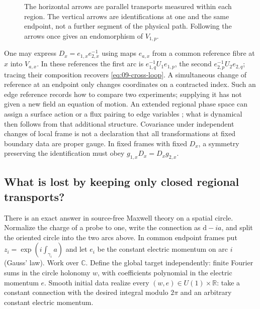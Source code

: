 \begin{figure}[htb]\centering
{}
\caption{The horizontal arrows are parallel transports measured within each region. The vertical arrows are identifications at one and the same endpoint, not a further segment of the physical path. Following the arrows once gives an endomorphism of $V_{1,p}$.}\label{fig:transport-cycle}\end{figure}

One may express $D_x=e_{1,x}e_{2,x}^{-1}$ using maps $e_{a,x}$ from a common reference fibre at $x$ into $V_{a,x}$. In these references the first arc is $e_{1,q}^{-1}U_1 e_{1,p}$, the second $e_{2,p}^{-1}U_2 e_{2,q}$; tracing their composition recovers \eqref{eq:09-cross-loop}. A simultaneous change of reference at an endpoint only changes coordinates on a contracted index. Such an edge reference records how to compare two experiments; supplying it has not given a new field an equation of motion. An extended regional phase space can assign a surface action or a flux pairing to edge variables \cite{DF}; what is dynamical then follows from that additional structure. Covariance under independent changes of local frame is not a declaration that all transformations at fixed boundary data are proper gauge. In fixed frames with fixed $D_x$, a symmetry preserving the identification must obey $g_{1,x}D_x=D_xg_{2,x}$.

\subsection{What is lost by keeping only closed regional transports?}

There is an exact answer in source-free Maxwell theory on a spatial circle. Normalize the charge of a probe to one, write the connection as $\mathrm{d}-i a$, and split the oriented circle into the two arcs above. In common endpoint frames put $z_i=\exp(i\int_{\gamma_i}a)$ and let $e_i$ be the constant electric momentum on arc $i$ (Gauss' law). Work over $\mathbb C$. Define the global target independently: finite Fourier sums in the circle holonomy $w$, with coefficients polynomial in the electric momentum $e$. Smooth initial data realize every $(w,e)\in U(1)\times\mathbb R$: take a constant connection with the desired integral modulo $2\pi$ and an arbitrary constant electric momentum.

